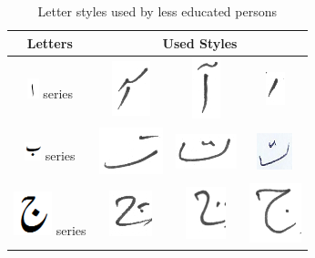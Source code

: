 \begin{table}[h]
\centering
\caption{Letter styles used by less educated persons}\label{tab6-led}
\begin{tabular}{@{}cccc@{}}
\hline
Letters	& \multicolumn{3}{c}{\textbf{Used Styles}} \\ \hline
\includegraphics[scale=0.50]{Alif.png} series & \includegraphics[scale=0.25]{alif_madd.PNG} & \includegraphics[scale=0.25]{ali_madd2.PNG}  & \includegraphics[scale=0.45]{alif_1.PNG}  \\ 
\hline
\includegraphics[scale=0.50]{Bay.png} series & \includegraphics[scale=0.20]{tai.PNG} & \includegraphics[scale=0.20]{tai2.PNG}  & \includegraphics[scale=0.20]{Tai3.png} \\
\hline
\includegraphics[scale=0.25]{jeeem} series & \includegraphics[scale=0.25]{chay} & \includegraphics[scale=0.20]{jeem}  & \includegraphics[scale=0.15]{jeeem2} \\

\end{tabular}
\end{table}
